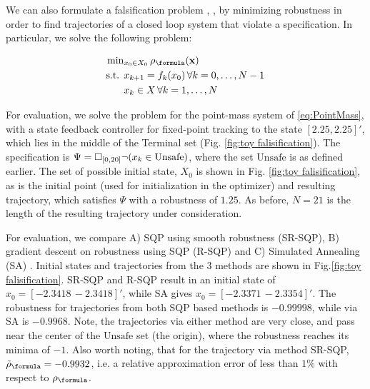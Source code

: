 We can also formulate a falsification problem \cite{AbbasATVA11_LinFalsification}, \cite{AbbasF_HybridSA12}, \cite{Deshmukh15_IterativeApproaches} by minimizing robustness in order to find trajectories of a closed loop system that violate a specification. In particular, we solve the following problem:

\begin{subequations}
\vspace{-10pt}
\label{eq:falsification}
\begin{align}
\text{min}&_{x_0 \in X_0 } \, \rob_{\formula}(\sstraj) \nonumber \\
\text{s.t. } & x_{k+1} = f_k(x_0) \, \forall k=0,\dotsc,N-1 \\
&  x_{k} \in X \, \forall k=1,\dotsc,N
\end{align}
\end{subequations}

For evaluation, we solve the problem for the point-mass system of \eqref{eq:PointMass}, with a state feedback controller for fixed-point tracking to the state $[2.25,2.25]'$, which lies in the middle of the Terminal set (Fig. \ref{fig:toy falisification}). The specification is $\Psi=\square_{[0,20]} \neg (x_k \in \text{Unsafe})$, where the set $\text{Unsafe}$ is as defined earlier. The set of possible initial state, $X_0$ is shown in Fig. \ref{fig:toy falisification}, as is the initial point (used for initialization in the optimizer) and resulting trajectory, which satisfies $\Psi$ with a robustness of $1.25$. As before, $N=21$ is the length of the resulting trajectory under consideration.

For evaluation, we compare A) SQP using smooth robustness (SR-SQP), B) gradient descent on robustness using SQP (R-SQP) and C) Simulated Annealing (SA) \cite{SA_book}. Initial states and trajectories from the 3 methods are shown in Fig.\ref{fig:toy falisification}. SR-SQP and R-SQP result in an initial state of $x_0=[-2.3418\, -2.3418]'$, while SA gives $x_0=[-2.3371\, -2.3354]'$. The robustness for trajectories from both SQP based methods is $-0.99998$, while via SA is $-0.9968$. Note, the trajectories via either method are very close, and pass near the center of the $\text{Unsafe}$ set (the origin), where the robustness reaches its minima of $-1$. Also worth noting, that for the trajectory via method SR-SQP, $\srob_{\formula}=-0.9932$, i.e. a relative approximation error of less than $1\%$ with respect to $\rob_{\formula}$.

